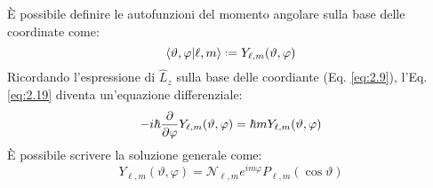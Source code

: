 È possibile definire le autofunzioni del momento angolare sulla base delle coordinate come:
\begin{equation}
	\braket{\vartheta,\varphi | \ell,m} \defeq Y_{\ell,m}(\vartheta,\varphi)
	\label{eq:2.22}
\end{equation}
Ricordando l'espressione di $ \hat{L}_z $ sulla base delle coordiante (Eq. \ref{eq:2.9}), l'Eq. \ref{eq:2.19} diventa un'equazione differenziale:
\begin{equation}
	-i\hbar \frac{\partial}{\partial \varphi} Y_{\ell,m}(\vartheta,\varphi) = \hbar m Y_{\ell,m}(\vartheta,\varphi)
	\label{eq:2.23}
\end{equation}
È possibile scrivere la soluzione generale come:
\begin{equation}
	Y_{\ell,m}(\vartheta,\varphi) = \mathcal{N}_{\ell,m} e^{im\varphi} P_{\ell,m}(\cos\vartheta)
	\label{eq:2.24}
\end{equation}










